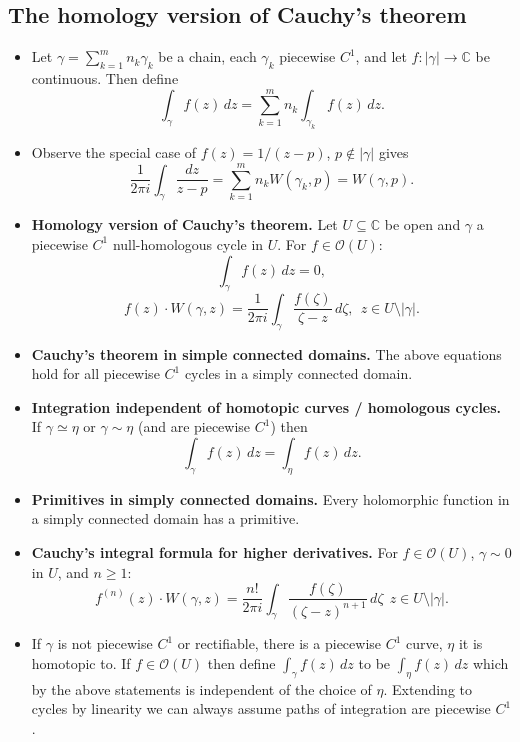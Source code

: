 \documentclass{article}
\newenvironment{topic}[1]{%
{\subsection{#1}}%
\begin{itemize}%
}{%
\end{itemize}%
}
\newcommand{\theorem}[1]{\item {\bf #1.}}
\newcommand{\corollary}[1]{\item {\bf #1.}}
\newcommand{\holo}[1]{\mathcal{O}(#1)}
\newcommand{\remark}{\item}
\begin{document}
\begin{topic}{The homology version of Cauchy's theorem}

\remark Let $\gamma = \sum_{k=1}^m n_k \gamma_k$ be a chain, each $\gamma_k$ piecewise $C^1$, and let $f : |\gamma| \to \mathbb{C}$ be continuous. Then define $$\int_\gamma f(z)\,dz = \sum_{k=1}^m n_k \int_{\gamma_k} f(z)\,dz.$$

\remark Observe the special case of $f(z) = 1/(z-p)$, $p \not\in |\gamma|$ gives $$\dfrac{1}{2 \pi i} \int_\gamma \dfrac{dz}{z - p} = \sum_{k=1}^m n_k W(\gamma_k, p) = W(\gamma, p).$$

\theorem{Homology version of Cauchy's theorem} Let $U \subseteq \mathbb{C}$ be open and $\gamma$ a piecewise $C^1$ null-homologous cycle in $U$. For $f \in \holo{U}$: $$\int_\gamma f(z)\,dz = 0,$$ $$f(z) \cdot W(\gamma, z) = \dfrac{1}{2 \pi i} \int_\gamma \dfrac{f(\zeta)}{\zeta - z}\,d\zeta,~~z \in U \setminus |\gamma|.$$

\corollary{Cauchy's theorem in simple connected domains} The above equations hold for all piecewise $C^1$ cycles in a simply connected domain.

\corollary{Integration independent of homotopic curves / homologous cycles} If $\gamma \simeq \eta$ or $\gamma \sim \eta$ (and are piecewise $C^1$) then $$\int_\gamma f(z)\,dz = \int_\eta f(z)\,dz.$$

\theorem{Primitives in simply connected domains} Every holomorphic function in a simply connected domain has a primitive.

\corollary{Cauchy's integral formula for higher derivatives} For $f \in \holo{U}$, $\gamma \sim 0$ in $U$, and $n \geq 1$: $$f^{(n)}(z) \cdot W(\gamma, z) = \dfrac{n!}{2 \pi i} \int_\gamma \dfrac{f(\zeta)}{(\zeta - z)^{n+1}}\,d\zeta~~z \in U \setminus |\gamma|.$$

\remark If $\gamma$ is not piecewise $C^1$ or rectifiable, there is a piecewise $C^1$ curve, $\eta$ it is homotopic to. If $f \in \holo{U}$ then define $\int_\gamma f(z)\,dz$ to be $\int_\eta f(z)\,dz$ which by the above statements is independent of the choice of $\eta$. Extending to cycles by linearity we can always assume paths of integration are piecewise $C^1$.

\end{topic}


\end{document}
